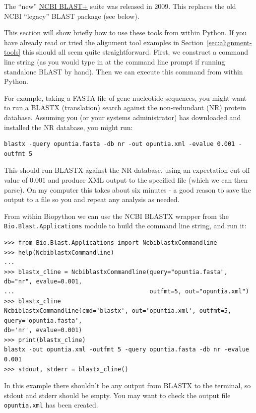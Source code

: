 \documentclass{report}
\begin{document}
The ``new''
\href{http://blast.ncbi.nlm.nih.gov/Blast.cgi?CMD=Web&PAGE_TYPE=BlastDocs&DOC_TYPE=Download}
{NCBI BLAST+} suite was released in 2009. This replaces the old NCBI ``legacy'' BLAST
package (see below).

This section will show briefly how to use these tools from within Python. If you have
already read or tried the alignment tool examples in Section~\ref{sec:alignment-tools}
this should all seem quite straightforward. First, we construct a command line string
(as you would type in at the command line prompt if running standalone BLAST by hand).
Then we can execute this command from within Python.

For example, taking a FASTA file of gene nucleotide sequences, you might want to
run a BLASTX (translation) search against the non-redundant (NR) protein database.
Assuming you (or your systems administrator) has downloaded and installed the NR
database, you might run:

\begin{verbatim}
blastx -query opuntia.fasta -db nr -out opuntia.xml -evalue 0.001 -outfmt 5
\end{verbatim}

This should run BLASTX against the NR database, using an expectation cut-off value
of $0.001$ and produce XML output to the specified file (which we can then parse).
On my computer this takes about six minutes - a good reason to save the output
to a file so you and repeat any analysis as needed.

From within Biopython we can use the NCBI BLASTX wrapper from the
\verb|Bio.Blast.Applications| module to build the command line string,
and run it:

\begin{verbatim}
>>> from Bio.Blast.Applications import NcbiblastxCommandline
>>> help(NcbiblastxCommandline)
...
>>> blastx_cline = NcbiblastxCommandline(query="opuntia.fasta", db="nr", evalue=0.001,
...                                      outfmt=5, out="opuntia.xml")
>>> blastx_cline
NcbiblastxCommandline(cmd='blastx', out='opuntia.xml', outfmt=5, query='opuntia.fasta',
db='nr', evalue=0.001)
>>> print(blastx_cline)
blastx -out opuntia.xml -outfmt 5 -query opuntia.fasta -db nr -evalue 0.001
>>> stdout, stderr = blastx_cline()
\end{verbatim}

In this example there shouldn't be any output from BLASTX to the terminal,
so stdout and stderr should be empty. You may want to check the output file
\verb|opuntia.xml| has been created.
\end{document}
